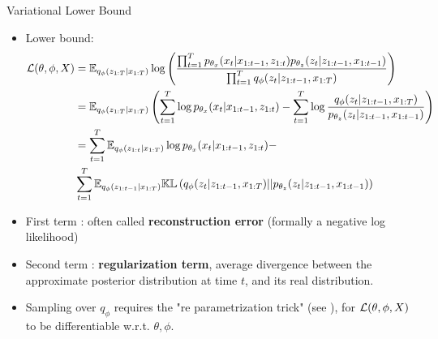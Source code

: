 \begin{frame}{Variational Lower Bound}
    \begin{itemize}
        \item Lower bound:
        \begin{align}
            \mathcal{L}(\theta, \phi, X) &= \mathbb{E}_{q_{\phi}(z_{1:T}\vert x_{1:T})} \log{\left( \frac{\prod_{t=1}^T p_{\theta_x}(x_t \vert x_{1:t-1}, z_{1:t}) p_{\theta_z}(z_t \vert z_{1:t-1}, x_{1:t-1})}{\prod_{t=1}^T q_\phi (z_t \vert z_{1:t-1}, x_{1:T})} \right)} \\
            &= \mathbb{E}_{q_{\phi}(z_{1:T}\vert x_{1:T})} \left(  \sum_{t=1}^T \log{p_{\theta_x}(x_t \vert x_{1:t-1}, z_{1:t})} - \sum_{t=1}^T \log{\frac{q_\phi (z_t \vert z_{1:t-1}, x_{1:T})}{p_{\theta_z}(z_t \vert z_{1:t-1}, x_{1:t-1})}}
            \right) \\
            &= \sum_{t=1}^T \mathbb{E}_{q_\phi(z_{1:t} \vert x_{1:T})} \log{p_{\theta_x}(x_t \vert x_{1:t-1}, z_{1:t})} -\\
            &\sum_{t=1}^T \mathbb{E}_{q_\phi(z_{1:t-1} \vert x_{1:T})} \mathbb{KL}\left( q_\phi(z_t \vert z_{1:t-1}, x_{1:T}) \vert\vert p_{\theta_z}(z_t \vert z_{1:t-1}, x_{1:t-1}) \right)
        \end{align}
        \item First term : often called \textbf{reconstruction error} (formally a negative log likelihood)
        \item Second term : \textbf{regularization term}, average divergence between the approximate posterior distribution at time $t$, and its real distribution.
        \item Sampling over $q_\phi$ requires the "re parametrization trick" (see \cite{kingma_introduction_2019}), for $\mathcal{L}(\theta, \phi, X)$ to be differentiable w.r.t. $\theta, \phi$.
    \end{itemize}
\end{frame}

